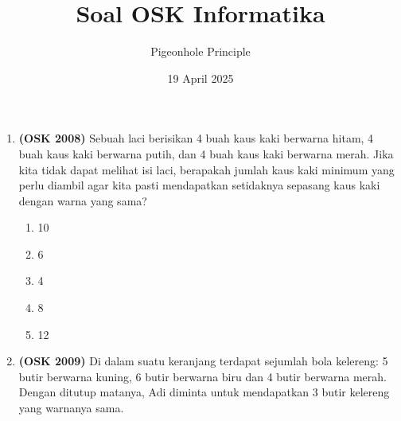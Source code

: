 \documentclass[a4paper]{article}
\title{Soal OSK Informatika}
\author{Pigeonhole Principle}
\date{19 April 2025}
\begin{document}
\maketitle
  \begin{enumerate}
    \item\textbf{(OSK 2008)} Sebuah laci berisikan 4 buah kaus kaki berwarna hitam, 4 buah kaus kaki berwarna putih, dan 4 buah kaus kaki berwarna merah. Jika kita tidak dapat melihat isi laci, berapakah jumlah kaus kaki minimum yang perlu diambil agar kita pasti mendapatkan setidaknya sepasang kaus kaki dengan warna yang sama?
    \begin{multicols}{5}
      \begin{enumerate}[label=\Alph*.]
        \item 10
        \item 6
        \item 4
        \item 8
        \item 12
    \end{enumerate}
    \end{multicols}
    \item\textbf{(OSK 2009)} Di dalam suatu keranjang terdapat sejumlah bola kelereng: 5 butir berwarna kuning, 6 butir berwarna biru dan 4 butir berwarna merah. Dengan ditutup matanya, Adi diminta untuk mendapatkan 3 butir kelereng yang warnanya sama. 


\end{enumerate}
\end{document}
